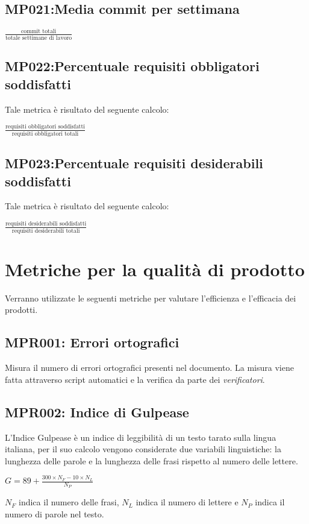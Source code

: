 \subsection{MP021:Media commit per settimana}
\begin{center}
	$\frac{\mbox{commit totali}}{\mbox{totale settimane di lavoro}}$
\end{center}


\subsection{MP022:Percentuale requisiti obbligatori soddisfatti}
 Tale metrica è risultato del seguente calcolo:
 \begin{center}
 	$\frac{\mbox{requisiti obbligatori soddisfatti}}{\mbox{requisiti obbligatori totali}}$
 \end{center}

\subsection{MP023:Percentuale requisiti desiderabili soddisfatti}
Tale metrica è risultato del seguente calcolo:
\begin{center}
$\frac{\mbox{requisiti desiderabili soddisfatti}}{\mbox{requisiti desiderabili totali}}$
\end{center}

\section{Metriche per la qualità di prodotto}\label{metriche}
Verranno utilizzate le seguenti metriche per valutare l'efficienza e l'efficacia dei
prodotti.
\subsection{MPR001: Errori ortografici}
Misura il numero di errori ortografici presenti nel documento. La misura viene fatta attraverso script automatici e la verifica da parte dei \textit{verificatori}.

\subsection{MPR002: Indice di Gulpease}
L’Indice Gulpease è un indice di leggibilità di un testo tarato sulla lingua italiana, per il suo calcolo vengono considerate due variabili linguistiche: la lunghezza delle parole e la lunghezza delle frasi rispetto al numero delle lettere.
\begin{center}{$G=89+\frac{300\times N_F-10\times N_L}{N_P}$}\end{center}
$N_F$ indica il numero delle frasi, $N_L$ indica il numero di lettere e $N_P$ indica il numero di parole nel testo.

